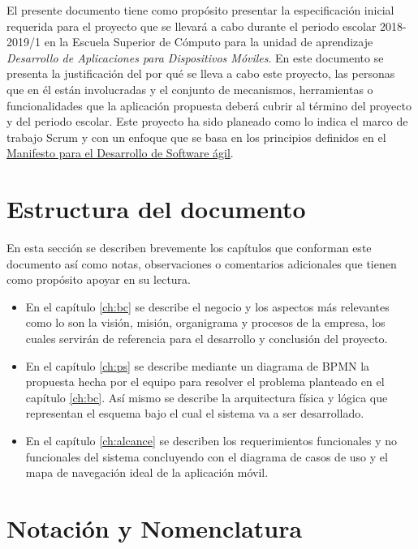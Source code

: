 El presente documento tiene como propósito presentar la especificación inicial requerida para el proyecto que se llevará a cabo durante el periodo escolar 2018-2019/1 en la Escuela Superior de Cómputo para la unidad de aprendizaje \textit{Desarrollo de Aplicaciones para Dispositivos Móviles}. En este documento se presenta la justificación del por qué se lleva a cabo este proyecto, las personas que en él están involucradas y el conjunto de mecanismos, herramientas o funcionalidades que la aplicación propuesta deberá cubrir al término del proyecto y del periodo escolar. Este proyecto ha sido planeado como lo indica el marco de trabajo Scrum y con un enfoque que se basa en los principios definidos en el \href{http://agilemanifesto.org}{Manifesto para el Desarrollo de Software ágil}.

\section{Estructura del documento}

En esta sección se describen brevemente los capítulos que conforman este documento así como notas, observaciones o comentarios adicionales que tienen como propósito apoyar en su lectura. 
\begin{itemize}
	\item En el capítulo \ref{ch:bc} se describe el negocio y los aspectos más relevantes como lo son la visión, misión, organigrama y procesos de la empresa, los cuales servirán de referencia para el desarrollo y conclusión del proyecto.
	
	\item En el capítulo \ref{ch:ps} se describe mediante un diagrama de BPMN la propuesta hecha por el equipo para resolver el problema planteado en el capítulo \ref{ch:bc}. Así mismo se describe la arquitectura física y lógica que representan el esquema bajo el cual el sistema va a ser desarrollado.
	
	\item En el capítulo \ref{ch:alcance} se describen los requerimientos funcionales y no funcionales del sistema concluyendo con el diagrama de casos de uso y el mapa de navegación ideal de la aplicación móvil.
\end{itemize}

\section{Notación y Nomenclatura}


